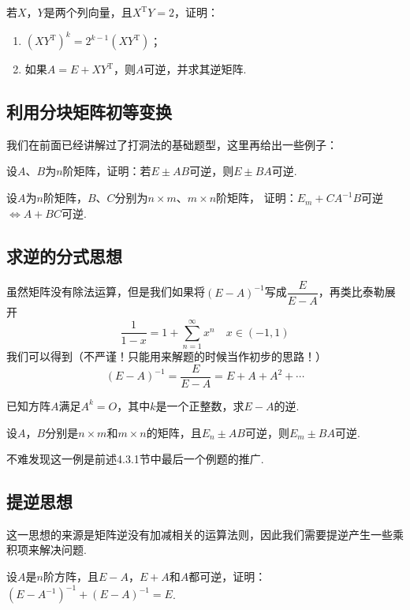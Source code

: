 \begin{example}
    若$X$，$Y$是两个列向量，且$X^\mathrm{T}Y=2$，证明：
    \begin{enumerate}
        \item $(XY^\mathrm{T})^k=2^{k-1}(XY^{\mathrm{T}})$；

        \item 如果$A=E+XY^\mathrm{T}$，则$A$可逆，并求其逆矩阵.
    \end{enumerate}
\end{example}

\subsection{利用分块矩阵初等变换}
我们在前面已经讲解过了打洞法的基础题型，这里再给出一些例子：
\begin{example}
    设$A$、$B$为$n$阶矩阵，证明：若$E\pm AB$可逆，则$E\pm BA$可逆.
\end{example}
\begin{example}
    设$A$为$n$阶矩阵，$B$、$C$分别为$n \times m$、$m \times n$阶矩阵，
    证明：$E_m+CA^{-1}B$可逆$\iff A+BC$可逆.
\end{example}

\subsection{求逆的分式思想}
虽然矩阵没有除法运算，但是我们如果将$(E-A)^{-1}$写成$\dfrac{E}{E-A}$，再类比泰勒展开
\[\frac{1}{1-x}=1+\sum_{n=1}^\infty x^n \quad x\in (-1,1)\]我们可以得到（不严谨！只能用来解题的时候当作初步的思路！）
\[(E-A)^{-1}=\frac{E}{E-A}=E+A+A^2+\cdots\]

\begin{example}
    已知方阵$A$满足$A^k=O$，其中$k$是一个正整数，求$E-A$的逆.
\end{example}

\begin{example}
    设$A$，$B$分别是$n \times m$和$m \times n$的矩阵，且$E_n \pm AB$可逆，则$E_m \pm BA$可逆.
\end{example}
不难发现这一例是前述4.3.1节中最后一个例题的推广. %

\subsection{提逆思想}
这一思想的来源是矩阵逆没有加减相关的运算法则，因此我们需要提逆产生一些乘积项来解决问题.
\begin{example}
    设$A$是$n$阶方阵，且$E-A$，$E+A$和$A$都可逆，证明：$(E-A^{-1})^{-1}+(E-A)^{-1}=E$.
\end{example}

